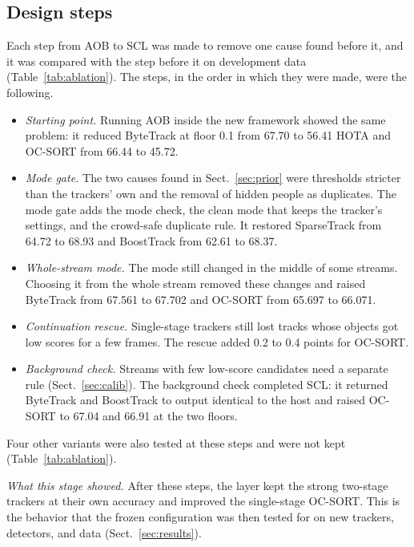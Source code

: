 \documentclass[pdflatex,referee,sn-mathphys-num]{sn-jnl}
\newcommand{\scl}{SCL}
\newcommand{\aob}{AOB}
\begin{document}
\subsection{Design steps}\label{sec:steps}
Each step from \aob{} to \scl{} was made to remove one cause found before it,
and it was compared with the step before it on development data
(Table~\ref{tab:ablation}). The steps, in the order in which they were made,
were the following.
\begin{itemize}
\item \emph{Starting point.} Running \aob{} inside the new framework showed
      the same problem: it reduced ByteTrack at floor 0.1 from 67.70 to 56.41
      HOTA and OC-SORT from 66.44 to 45.72.
\item \emph{Mode gate.} The two causes found in Sect.~\ref{sec:prior} were
      thresholds stricter than the trackers' own and the removal of hidden
      people as duplicates. The mode gate adds the mode check, the clean mode
      that keeps the tracker's settings, and the crowd-safe duplicate rule. It
      restored SparseTrack from 64.72 to 68.93 and BoostTrack from 62.61
      to 68.37.
\item \emph{Whole-stream mode.} The mode still changed in the middle of some
      streams. Choosing it from the whole stream removed these changes and
      raised ByteTrack from 67.561 to 67.702 and OC-SORT from 65.697 to
      66.071.
\item \emph{Continuation rescue.} Single-stage trackers still lost tracks
      whose objects got low scores for a few frames. The rescue added 0.2 to
      0.4 points for OC-SORT.
\item \emph{Background check.} Streams with few low-score candidates need a
      separate rule (Sect.~\ref{sec:calib}). The background check
      completed \scl{}: it returned ByteTrack and BoostTrack to output
      identical to the host and raised OC-SORT to 67.04 and 66.91 at the two
      floors.
\end{itemize}
Four other variants were also tested at these steps and were not kept
(Table~\ref{tab:ablation}).

\emph{What this stage showed.} After these steps, the layer kept the strong
two-stage trackers at their own accuracy and improved the single-stage
OC-SORT. This is the behavior that the frozen configuration was then tested
for on new trackers, detectors, and data (Sect.~\ref{sec:results}).
\end{document}
